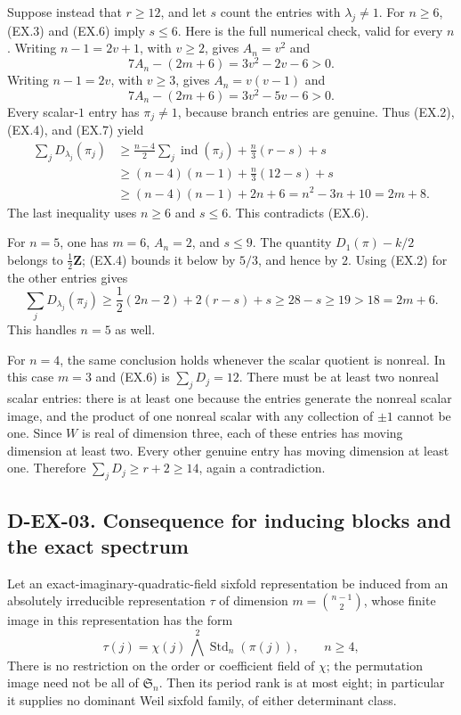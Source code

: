 Suppose instead that $r\ge12$, and let $s$ count the entries
with $\lambda_j\ne1$.  For $n\ge6$, (EX.3) and (EX.6) imply
$s\le6$.  Here is the full numerical check, valid for every $n$.
Writing $n-1=2v+1$, with $v\ge2$, gives $A_n=v^2$ and
\[
             7A_n-(2m+6)=3v^2-2v-6>0.
\]
Writing $n-1=2v$, with $v\ge3$, gives $A_n=v(v-1)$ and
\[
             7A_n-(2m+6)=3v^2-5v-6>0.
\]
Every scalar-$1$ entry has $\pi_j\ne1$, because branch entries are
genuine.  Thus (EX.2), (EX.4), and (EX.7) yield
\begin{align*}
 \sum_jD_{\lambda_j}(\pi_j)
 &\ge\frac{n-4}{2}\sum_j\operatorname{ind}(\pi_j)
            +\frac n3(r-s)+s\\
 &\ge(n-4)(n-1)+\frac n3(12-s)+s\\
 &\ge(n-4)(n-1)+2n+6
       =n^2-3n+10=2m+8.
\end{align*}
The last inequality uses $n\ge6$ and $s\le6$.
This contradicts (EX.6).

For $n=5$, one has $m=6$, $A_n=2$, and $s\le9$.
The quantity $D_1(\pi)-k/2$ belongs to $\frac12\mathbf Z$;
(EX.4) bounds it below by $5/3$, and hence by $2$.
Using (EX.2) for the other entries gives
\[
 \sum_jD_{\lambda_j}(\pi_j)
       \ge\frac12(2n-2)+2(r-s)+s
       \ge28-s\ge19>18=2m+6.
\]
This handles $n=5$ as well.

For $n=4$, the same conclusion holds whenever the scalar quotient
is nonreal.  In this case $m=3$ and (EX.6) is $\sum_jD_j=12$.
There must be at least two nonreal scalar entries: there is at least
one because the entries generate the nonreal scalar image, and the
product of one nonreal scalar with any collection of $\pm1$ cannot
be one.  Since $W$ is real of dimension three, each of these entries
has moving dimension at least two.  Every other genuine entry has
moving dimension at least one.  Therefore
$\sum_jD_j\ge r+2\ge14$, again a contradiction.

\subsection*{D-EX-03. Consequence for inducing blocks and the exact spectrum}

Let an exact-imaginary-quadratic-field sixfold representation be
induced from an absolutely irreducible representation $\tau$ of
dimension $m=\binom{n-1}{2}$, whose finite image in this representation
has the form
\[
      \tau(j)=\chi(j)\,\bigwedge^2\operatorname{Std}_n(\pi(j)),
      \qquad n\ge4,
                                                               \tag{EX.8}
\]
There is no restriction on the order or coefficient field of $\chi$;
the permutation image need not be all of $\mathfrak S_n$.
Then its period rank is at most eight; in particular it supplies
no dominant Weil sixfold family, of either determinant class.

